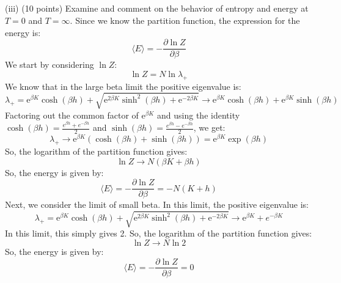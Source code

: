 \documentclass[12pt]{article}
\begin{document}
\subsection{}
(iii) (10 points) Examine and comment on the behavior of entropy and energy at $T=0$ and $T=\infty$.
Since we know the partition function, the expression for the energy is:
\begin{equation}
\langle E\rangle=-\frac{\partial \ln Z}{\partial \beta}
\end{equation}
We start by considering $\ln Z$:
\begin{equation}
\ln Z = N \ln \lambda_{+}
\end{equation}
We know that in the large beta limit the positive eigenvalue is:
\begin{equation}
\lambda_{+}=\mathrm{e}^{\beta K} \cosh (\beta h) + \sqrt{\mathrm{e}^{2 \beta K} \sinh ^{2}(\beta h)+\mathrm{e}^{-2 \beta K}} \rightarrow \mathrm{e}^{\beta K} \cosh (\beta h) + \mathrm{e}^{\beta K} \sinh (\beta h)
\end{equation}
Factoring out the common factor of $\mathrm{e}^{\beta K}$ and using the identity $\cosh(\beta h) = \frac{e^{\beta h} + e^{-\beta h}}{2}$ and $\sinh(\beta h) = \frac{e^{\beta h} - e^{-\beta h}}{2}$, we get:
\begin{equation}
\lambda_{+} \rightarrow \mathrm{e}^{\beta K} \left(\cosh (\beta h) + \sinh (\beta h)\right) = \mathrm{e}^{\beta K} \exp(\beta h)
\end{equation}
So, the logarithm of the partition function gives:
\begin{equation}
\ln Z \rightarrow N \left(\beta K + \beta h\right)
\end{equation}
So, the energy is given by:
\begin{equation}
\langle E\rangle=-\frac{\partial \ln Z}{\partial \beta}=-N\left(K+h\right)
\end{equation}
Next, we consider the limit of small beta. In this limit, the positive eigenvalue is:
\begin{equation}
\lambda_{+}=\mathrm{e}^{\beta K} \cosh (\beta h) + \sqrt{\mathrm{e}^{2 \beta K} \sinh ^{2}(\beta h)+\mathrm{e}^{-2 \beta K}} \rightarrow \mathrm{e}^{\beta K} + e^{-\beta K}
\end{equation}
In this limit, this simply gives 2. So, the logarithm of the partition function gives:
\begin{equation}
\ln Z \rightarrow N \ln 2
\end{equation}
So, the energy is given by:
\begin{equation}
\langle E\rangle=-\frac{\partial \ln Z}{\partial \beta}=0
\end{equation}
\end{document}
